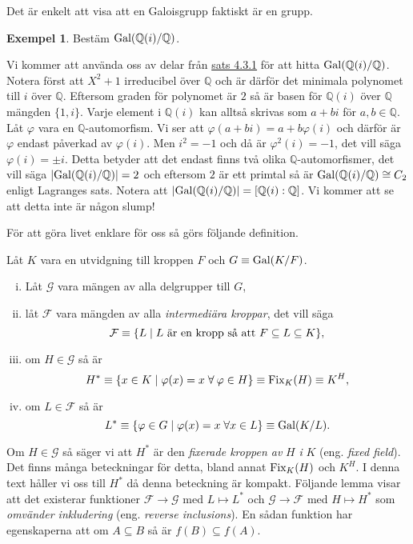 \documentclass{article}
\newcommand{\gal}[0]{\textnormal{Gal}}
\newcommand{\fix}[0]{\textnormal{Fix}}
\theoremstyle{definition}
\newtheorem{exmp}[thm]{Exempel}
\begin{document}
Det är enkelt att visa att en Galoisgrupp faktiskt är en grupp.

\begin{exmp}
  Bestäm $\gal(\mathbb{Q}(i)/\mathbb{Q})$.
\end{exmp}

Vi kommer att använda oss av delar från \hyperlink{minpol}{sats 4.3.1} för att hitta $\gal(\mathbb{Q}(i)/\mathbb{Q})$. 
Notera först att $X^2 + 1$ irreducibel över $\mathbb{Q}$ och är därför det minimala polynomet till $i$ över $\mathbb{Q}$.
Eftersom graden för polynomet är $2$ så är basen för $\mathbb{Q}(i)$ över $\mathbb{Q}$ mängden $\{1, i\}$. Varje element i $\mathbb{Q}(i)$
kan alltså skrivas som $a + bi$ för $a, b \in \mathbb{Q}$. Låt $\varphi$ vara en $\mathbb{Q}$-automorfism. Vi ser att $\varphi(a + bi) = a + b\varphi(i)$
och därför är $\varphi$ endast påverkad av $\varphi(i)$. Men $i^2 = -1$ och då är $\varphi^2(i) = -1$, det vill säga $\varphi(i) = \pm i.$
Detta betyder att det endast finns två olika $\mathbb{Q}$-automorfismer, det vill säga $|\gal(\mathbb{Q}(i)/\mathbb{Q})| = 2$
och eftersom $2$ är ett primtal så är $\gal(\mathbb{Q}(i)/\mathbb{Q}) \cong C_2$ enligt Lagranges sats. Notera att 
$|\gal(\mathbb{Q}(i)/\mathbb{Q})| = [\mathbb{Q}(i) : \mathbb{Q}]$. Vi kommer att se att detta inte är någon slump!

För att göra livet enklare för oss så görs följande definition.
\begin{mydef}{}{}
  Låt $K$ vara en utvidgning till kroppen $F$ och $G \equiv \gal(K/F)$. 
  \begin{enumerate}[(i)]
    \item Låt $\mathcal{G}$ vara mängen av alla delgrupper till $G$, 
    \item låt $\mathcal{F}$ vara mängden av alla \textit{intermediära kroppar}, det vill säga 
    \[ \mathcal{F} \equiv \{L \; | \; L \textnormal{ är en kropp så att } F \subseteq L \subseteq K\}, \]
    \item om $H \in \mathcal{G}$ så är 
    \[ H^* \equiv \{ x \in K \; | \; \varphi(x) = x \; \forall \: \varphi  \in H \} \equiv \fix_K(H) \equiv K^H, \]
    \item om $L \in \mathcal{F}$  så är 
    \[ L^* \equiv \{ \varphi \in G \; | \; \varphi(x) = x \; \forall x \in L \} \equiv \gal(K/L). \]
  \end{enumerate}
\end{mydef}
Om $H \in \mathcal{G}$ så säger vi att $H^*$ är den \textit{fixerade kroppen av} $H$ \textit{i} $K$ (eng. \textit{fixed field}). Det 
finns många beteckningar för detta, bland annat $\fix_K(H)$ och $K^H$. I denna text håller vi oss till $H^*$ då denna beteckning är kompakt.
Följande lemma visar att det existerar funktioner $\mathcal{F} \rightarrow \mathcal{G}$ med $L \mapsto L^*$ och
$\mathcal{G} \rightarrow \mathcal{F}$ med $H \mapsto H^*$ som \textit{omvänder inkludering} (eng. \textit{reverse inclusions}). En sådan funktion 
har egenskaperna att om $A \subseteq B$ så är $f(B) \subseteq f(A)$.
\end{document}
